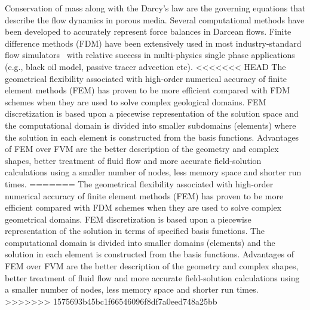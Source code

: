 \documentclass[preprint,authoryear,12pt]{elsarticle}
\begin{document}
\medskip 
Conservation of mass along with the Darcy's law are the governing equations that describe the flow dynamics in porous media. Several computational methods have been developed to accurately represent force balances in Darcean flows.
Finite difference methods (FDM) have been extensively used in most industry-standard flow simulators~\citep{aziz_1986, chen_2005, chang_1990} with relative success in multi-physics single phase applications (e.g., black oil model, passive tracer advection etc). 
<<<<<<< HEAD
The geometrical flexibility associated with high-order numerical accuracy of finite element methods (FEM) has proven to be more efficient compared with FDM schemes when they are used to solve complex geological domains. FEM discretization is based upon a piecewise representation of the solution space  and the computational domain is divided into smaller subdomains (elements) where the solution in each element is constructed from the basis functions. Advantages of FEM over FVM are the better description of the geometry and complex shapes, better treatment of fluid flow and more accurate field-solution calculations using a smaller number of nodes, less memory space and shorter run times. %
=======
The geometrical flexibility associated with high-order numerical accuracy of finite element methods (FEM) has proven to be more efficient compared with FDM schemes when they are used to solve complex geometrical domains. FEM discretization is based upon a piecewise representation of the solution in terms of specified basis functions. The computational domain is divided into smaller domains (elements) and the solution in each element is constructed from the basis functions. Advantages of FEM over FVM are the better description of the geometry and complex shapes, better treatment of fluid flow and more accurate field-solution calculations using a smaller number of nodes, less memory space and shorter run times. %
>>>>>>> 1575693b45bc1f66546096f8df7a0eed748a25bb
\end{document}

